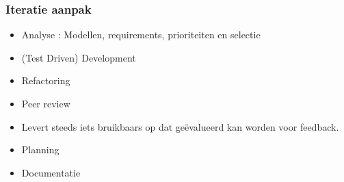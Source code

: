 \subsubsection{Iteratie aanpak}
\begin{itemize}
 \item Analyse : Modellen, requirements,  prioriteiten en selectie
 \item (Test Driven) Development
 \item Refactoring
 \item Peer review
 \item Levert steeds iets bruikbaars op dat ge\"evalueerd kan worden voor feedback.
 \item Planning
 \item Documentatie
\end{itemize}
